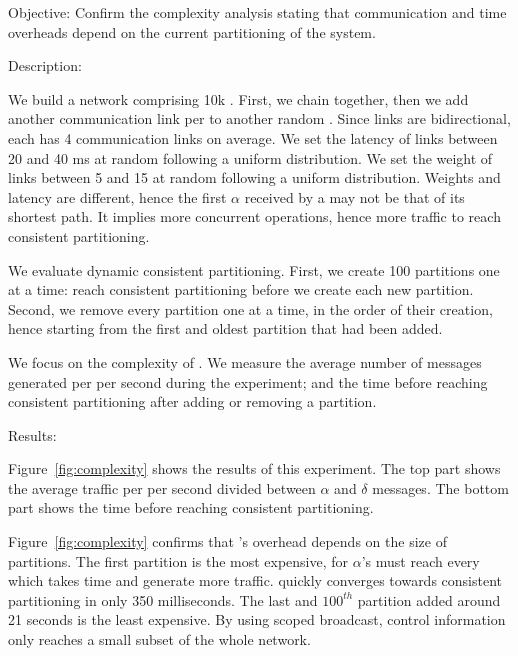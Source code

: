 \begin{asparadesc}
\item [Objective:] Confirm the complexity analysis stating that
  communication and time overheads depend on the current partitioning
  of the system.
  
\item [Description:]

We build a network comprising 10k \processes. First, we chain
\processes together, then we add another communication link per
\process to another random \process. Since links are bidirectional,
each \process has 4 communication links on average. We set the latency
of links between 20 and 40 ms at random following a uniform
distribution. We set the weight of links between 5 and 15 at random
following a uniform distribution. Weights and latency are different,
hence the first $\alpha$ received by a \process may not be that of its
shortest path. It implies more concurrent operations, hence more
traffic to reach consistent partitioning.

\noindent We evaluate dynamic consistent partitioning. First, we
create 100 partitions one at a time: \processes reach consistent
partitioning before we create each new partition. Second, we remove
every partition one at a time, in the order of their creation, hence
starting from the first and oldest partition that had been added.

\noindent We focus on the complexity of \NAME. We measure the average
number of messages generated per \process per second during the
experiment; and the time before reaching consistent partitioning after
adding or removing a partition.

\item [Results:]

Figure~\ref{fig:complexity} shows the results of this experiment. The
top part shows the average traffic per \process per second divided
between $\alpha$ and $\delta$ messages. The bottom part shows the time
before reaching consistent partitioning.

\noindent Figure~\ref{fig:complexity} confirms that \NAME's overhead
depends on the size of partitions. The first partition is the most
expensive, for $\alpha$'s must reach every \process which takes time
and generate more traffic.  \NAME quickly converges towards consistent
partitioning in only 350 milliseconds. The last and $100^{th}$
partition added around 21 seconds is the least expensive. By using
scoped broadcast, control information only reaches a small subset of
the whole network.


\end{asparadesc}
